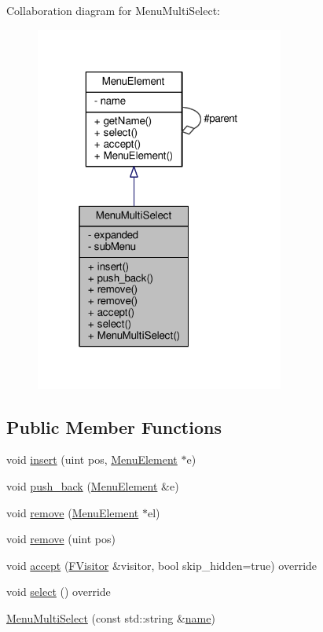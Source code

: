 Collaboration diagram for Menu\+Multi\+Select\+:
\nopagebreak
\begin{figure}[H]
\begin{center}
\leavevmode
\includegraphics[width=232pt]{classMenuMultiSelect__coll__graph}
\end{center}
\end{figure}
\subsection*{Public Member Functions}
\begin{DoxyCompactItemize}
\item 
void \hyperlink{classMenuMultiSelect_af1b3f6f62c5bab3a4a461ac4a032fcc4}{insert} (uint pos, \hyperlink{classMenuElement}{Menu\+Element} $\ast$e)
\item 
void \hyperlink{classMenuMultiSelect_a56e4cbb5c191f0790a586ec36ffe0e0a}{push\+\_\+back} (\hyperlink{classMenuElement}{Menu\+Element} \&e)
\item 
void \hyperlink{classMenuMultiSelect_a0a96589db24c6ca38e582ab420a6f3db}{remove} (\hyperlink{classMenuElement}{Menu\+Element} $\ast$el)
\item 
void \hyperlink{classMenuMultiSelect_a22463f3a2494e9b465047bb02e768bc1}{remove} (uint pos)
\item 
void \hyperlink{classMenuMultiSelect_a0758f4d20b850ebe3562bfde651cf0bf}{accept} (\hyperlink{classFVisitor}{F\+Visitor} \&visitor, bool skip\+\_\+hidden=true) override
\item 
void \hyperlink{classMenuMultiSelect_a1f38785618e99e3644b5903811748be1}{select} () override
\item 
\hyperlink{classMenuMultiSelect_ac1f71e63de20e2ca46bccdf76d558068}{Menu\+Multi\+Select} (const std\+::string \&\hyperlink{classMenuElement_ad7a280435eda4d231a68ae8645e7d98e}{name})
\end{DoxyCompactItemize}
